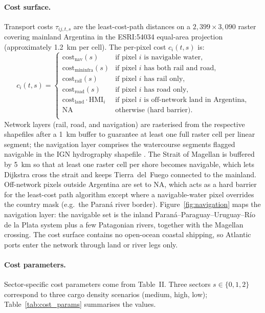 \paragraph{Cost surface.}
Transport costs $\tau_{ij,t,s}$ are the least-cost-path distances on
a $2{,}399 \times 3{,}090$ raster covering mainland Argentina in the
ESRI:54034 equal-area projection (approximately 1.2~km per cell). The
per-pixel cost $c_i(t,s)$ is:
\begin{equation*}
c_i(t, s) =
\begin{cases}
\text{cost}_{\mathrm{nav}}(s)                      & \text{if pixel $i$ is navigable water,} \\
\text{cost}_{\mathrm{mininfra}}(s)                 & \text{if pixel $i$ has both rail and road,} \\
\text{cost}_{\mathrm{rail}}(s)                     & \text{if pixel $i$ has rail only,} \\
\text{cost}_{\mathrm{road}}(s)                     & \text{if pixel $i$ has road only,} \\
\text{cost}_{\mathrm{land}} \cdot \mathrm{HMI}_i   & \text{if pixel $i$ is off-network land in Argentina,} \\
\text{NA}                                          & \text{otherwise (hard barrier).} \\
\end{cases}
\end{equation*}
Network layers (rail, road, and navigation) are rasterised from the
respective shapefiles after a 1~km buffer to guarantee at least one
full raster cell per linear segment; the navigation layer comprises
the watercourse segments flagged navigable in the IGN hydrography
shapefile \citep{ignhydro}. The Strait of Magellan is buffered
by 5~km so that at least one raster cell per shore becomes navigable,
which lets Dijkstra cross the strait and keeps Tierra~del~Fuego
connected to the mainland. Off-network pixels outside Argentina are
set to NA, which acts as a hard barrier for the least-cost path
algorithm except where a navigable-water pixel overrides the country
mask (e.g.\ the Paraná river border).
Figure~\ref{fig:navigation} maps the navigation layer: the navigable
set is the inland Paraná--Paraguay--Uruguay--Río de la Plata system
plus a few Patagonian rivers, together with the Magellan crossing.
The cost surface contains no open-ocean coastal shipping, so
Atlantic ports enter the network through land or river legs only.

\paragraph{Cost parameters.}
Sector-specific cost parameters come from \citet{baumgartnerpalazzo1969}
Table~II. Three sectors $s \in \{0, 1, 2\}$ correspond to three cargo
density scenarios (medium, high, low); Table~\ref{tab:cost_params}
summarises the values.

